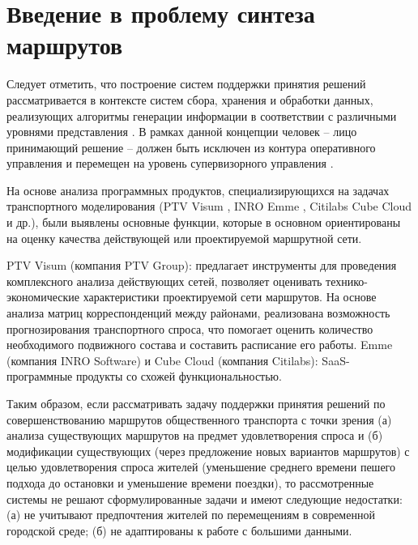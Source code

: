 \chapter{Введение в проблему синтеза маршрутов}
Следует отметить, что построение систем поддержки принятия решений рассматривается в контексте систем 
сбора, хранения и обработки данных, реализующих алгоритмы генерации информации в соответствии с различными 
уровнями представления \cite{bib:4}. В рамках данной концепции человек -- лицо принимающий решение -- 
должен быть исключен из контура оперативного управления и перемещен на уровень супервизорного управления 
\cite{bib:5}.

На основе анализа программных продуктов, специализирующихся на задачах транспортного моделирования 
(PTV Visum \cite{bib:6}, INRO Emme \cite{bib:7}, Citilabs Cube Cloud \cite{bib:8} и др.), были выявлены 
основные функции, которые в основном ориентированы на оценку качества действующей или проектируемой 
маршрутной сети.

PTV Visum (компания PTV Group): предлагает инструменты для проведения комплексного анализа действующих 
сетей, позволяет оценивать технико-экономические характеристики проектируемой сети маршрутов. На основе 
анализа матриц корреспонденций между районами, реализована возможность прогнозирования транспортного спроса, 
что помогает оценить количество необходимого подвижного состава и составить расписание его работы. 
Emme (компания INRO Software) и Cube Cloud (компания Citilabs): SaaS-программные продукты со схожей 
функциональностью.

Таким образом, если рассматривать задачу поддержки принятия решений по совершенствованию маршрутов 
общественного транспорта с точки зрения (а) анализа существующих маршрутов на предмет удовлетворения 
спроса и (б) модификации существующих (через предложение новых вариантов маршрутов) с целью удовлетворения 
спроса жителей (уменьшение среднего времени пешего подхода до остановки и уменьшение времени поездки), то 
рассмотренные системы не решают сформулированные задачи и имеют следующие недостатки: (а) не учитывают 
предпочтения жителей по перемещениям в современной городской среде; (б) не адаптированы к работе с 
большими данными.

